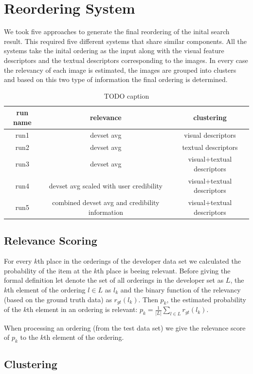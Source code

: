 \documentclass{acm_proc_article-me}
\begin{document}
\section{Reordering System}

We took five approaches to generate the final reordering of the inital search result. This required five different systems that share similar components. All the systems take the inital ordering as the input along with the visual feature descriptors and the textual descriptors corresponding to the images. In every case the relevancy of each image is estimated, the images are grouped into clusters and based on this two type of information the final ordering is determined.

\begin{table}[h]
\begin{tabular}{|c|c|c|}
	\hline 
	run name & relevance & clustering\tabularnewline
	\hline 
	\hline 
	run1 & devset avg & visual descriptors\tabularnewline
	\hline 
	run2 & devset avg & textual descriptors\tabularnewline
	\hline 
	run3 & devset avg & visual+textual descriptors\tabularnewline
	\hline 
	run4 & devset avg scaled with user credibility & visual+textual descriptors\tabularnewline
	\hline 
	run5 & combined devset avg and credibility information & visual+textual descriptors\tabularnewline
	\hline 
\end{tabular}
\caption{TODO caption}
\end{table}

\subsection{Relevance Scoring}

For every $k$th place in the orderings of the developer data set we calculated the probability of the item at the $k$th place is beeing relevant. Before giving the formal definition let denote the set of all orderings in the developer set as $L$, the $k$th element of the ordering $l \in L$ as $l_k$ and the binary function of the relevancy (based on the ground truth data) as $r_{gt}(l_k)$. Then $p_k$, the estimated probability of the $k$th element in an ordering is relevant:
$p_k = \frac{1}{|L|}\sum_{l \in L}r_{gt}(l_k)$.

When processing an ordering (from the test data set) we give the relevance score of $p_k$ to the $k$th element of the ordering.

\subsection{Clustering}
\end{document}
